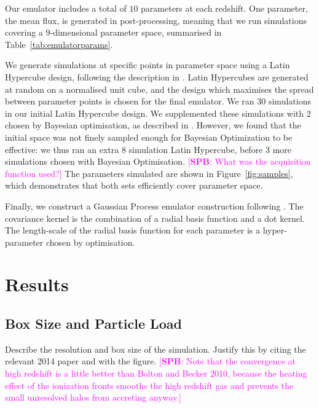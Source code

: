 \documentclass[a4paper,11pt]{article}
\newcommand{\spb}[1]{{\textcolor{magenta}{[{\bf SPB}: #1]}}}
\begin{document}
Our emulator includes a total of $10$ parameters at each redshift. One parameter, the mean flux, is generated in post-processing, meaning that we run simulations covering a $9$-dimensional parameter space, summarised in Table~\ref{tab:emulatorparams}.

We generate simulations at specific points in parameter space using a Latin Hypercube design, following the description in \cite{Bird:2019}. Latin Hypercubes are generated at random on a normalised unit cube, and the design which maximises the spread between parameter points is chosen for the final emulator. We ran $30$ simulations in our initial Latin Hypercube design. We supplemented these simulations with $2$ chosen by Bayesian optimisation, as described in \cite{Rogers:2019}. However, we found that the initial space was not finely sampled enough for Bayesian Optimization to be effective: we thus ran an extra $8$ simulation Latin Hypercube, before $3$ more simulations chosen with Bayesian Optimisation. \spb{What was the acquisition function used?} The parameters simulated are shown in Figure~\ref{fig:samples}, which demonstrates that both sets efficiently cover parameter space.

Finally, we construct a Gaussian Process emulator construction following \cite{Bird:2019}. The covariance kernel is the combination of a radial basis function and a dot kernel. The length-scale of the radial basis function for each parameter is a hyper-parameter chosen by optimisation.

\section{Results}

\subsection{Box Size and Particle Load}
\label{sec:boxsize}

Describe the resolution and box size of the simulation. Justify this by citing the relevant 2014 paper and with the figure. \spb{Note that the convergence at high redshift is a little better than Bolton and Becker 2010, because the heating effect of the ionization fronts smooths the high redshift gas and prevents the small unresolved halos from accreting anyway.}
\end{document}
